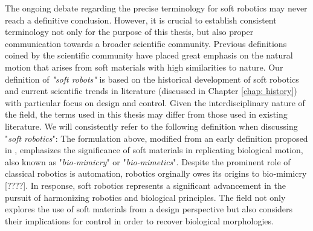 \par The ongoing debate regarding the precise terminology for soft robotics may never reach a definitive conclusion. However, it is crucial to establish consistent terminology not only for the purpose of this thesis, but also proper communication towards a broader scientific community. Previous definitions coined by the scientific community have placed great emphasis on the natural motion that arises from soft materials with high similarities to nature. Our definition of \textit{"soft robots"} is based on the historical development of soft robotics and current scientific trends in literature (discussed in Chapter \ref{chap: history}) with particular focus on design and control. Given the interdisciplinary nature of the field, the terms used in this thesis may differ from those used in existing literature. We will consistently refer to the following definition when discussing "\emph{soft robotics}":
%
%
The formulation above, modified from an early definition proposed in \cite{DellaSantina2020Springer}, emphasizes the significance of soft materials in replicating biological motion, also known as "\textit{bio-mimicry}" or "\textit{bio-mimetics}". Despite the prominent role of classical robotics is automation, robotics orginally owes its origins to bio-mimicry [????]. In response, soft robotics represents a significant advancement in the pursuit of harmonizing robotics and biological principles. The field not only explores the use of soft materials from a design perspective but also considers their implications for control in order to recover biological morphologies.


